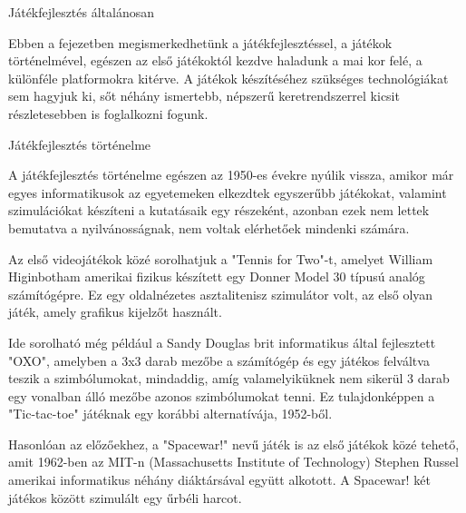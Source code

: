 \begin{MyChapter}{Játékfejlesztés általánosan}
	
	Ebben a fejezetben megismerkedhetünk a játékfejlesztéssel, a játékok történelmével, egészen az első játékoktól kezdve haladunk a mai kor felé, a különféle platformokra kitérve. A játékok készítéséhez szükséges technológiákat sem hagyjuk ki, sőt néhány ismertebb, népszerű keretrendszerrel kicsit részletesebben is foglalkozni fogunk.

	\begin{MySection}{Játékfejlesztés történelme}
		
		A játékfejlesztés történelme egészen az 1950-es évekre nyúlik vissza, amikor már egyes informatikusok az egyetemeken elkezdtek egyszerűbb játékokat, valamint szimulációkat készíteni a kutatásaik egy részeként, azonban ezek nem lettek bemutatva a nyilvánosságnak, nem voltak elérhetőek mindenki számára.  \cite{video_game_development}
		\cite{wiki_history_of_video_games}
		
		Az első videojátékok közé sorolhatjuk a "Tennis for Two"-t, amelyet William Higinbotham amerikai fizikus készített egy Donner Model 30 típusú analóg számítógépre. Ez egy oldalnézetes asztalitenisz szimulátor volt, az első olyan játék, amely grafikus kijelzőt használt.
		\cite{history.com_history_of_video_games}
		\cite{tennis_for_Two}
		
		Ide sorolható még például a Sandy Douglas brit informatikus által fejlesztett "OXO", amelyben a 3x3 darab mezőbe a számítógép és egy játékos felváltva teszik a szimbólumokat, mindaddig, amíg valamelyiküknek nem sikerül 3 darab egy vonalban álló mezőbe azonos szimbólumokat tenni. Ez tulajdonképpen a "Tic-tac-toe" játéknak egy korábbi alternatívája, 1952-ből.
		\cite{OXO}
		
		Hasonlóan az előzőekhez, a "Spacewar!" nevű játék is az első játékok közé tehető, amit 1962-ben az MIT-n (Massachusetts Institute of Technology) Stephen Russel amerikai informatikus néhány diáktársával együtt alkotott. A Spacewar! két játékos között szimulált egy űrbéli harcot.
		\cite{spacewar}
		\cite{steve_russell}
		

\end{MySection}
\end{MyChapter}
